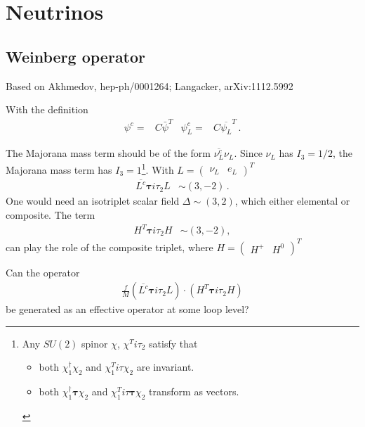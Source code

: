 \chapter{Neutrinos}

\section{Weinberg operator}
\label{sec:4weinberg-operator}

Based on Akhmedov, hep-ph/0001264; Langacker, arXiv:1112.5992

With the definition
\begin{align*}
  \psi^c=&C\bar{\psi}^T &\psi^c_L=&C\overline{\psi_L}^T\,.
\end{align*}

The Majorana mass term should be  of the form $\overline{\nu^{c}_L}\nu_L$. Since
$\nu_L$ has $I_3=1/2$, the Majorana mass term
has $I_3=1$\footnote{Any $SU(2)$ spinor $\chi$, $\chi^T i\tau_2$ satisfy that
  \begin{itemize}
  \item both $\chi_1^{\dagger}\chi_2$ and $\chi_1^T i\tau \chi_2$ are invariant.
  \item both $\chi_1^{\dagger}\boldsymbol{\tau}\chi_2$ and $\chi_1^T
    i\tau \boldsymbol{\tau}\chi_2$ transform as vectors.
  \end{itemize}
}. With $L=\begin{pmatrix}\nu_L&e_L\end{pmatrix}^T$
\begin{align*}
\overline{L^c}\boldsymbol{\tau}i\tau_2L&\sim \left( 3,-2 \right)\,.
\end{align*}
One would need an isotriplet scalar field $\Delta\sim (3,2)$, which
either elemental or composite. The term
\begin{align*}
  H^T \boldsymbol{\tau} i\tau_2H&\sim \left( 3,-2 \right),
\end{align*}
can play the role of the composite triplet, where $H=\begin{pmatrix}
H^+ & H^0\end{pmatrix}^T$

Can the operator
\begin{align*}
  \frac{f}{M}\left(\overline{L^c}\boldsymbol{\tau}i\tau_2L\right)\cdot
  \left( H^T \boldsymbol{\tau} i\tau_2H\right)
\end{align*}
be generated as an effective operator at some loop level?


